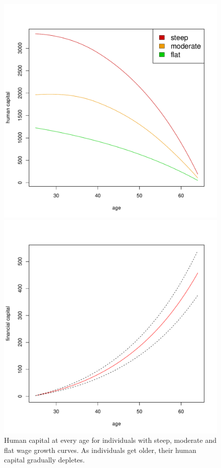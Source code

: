 \documentclass[]{elsarticle}
\begin{document}
\begin{figure}[h!]
	\centering
    \begin{minipage}{0.45\textwidth}
		\centering
		\includegraphics[scale=0.4]{figs/humancapital.pdf}
		\caption{Human capital at every age for individuals with steep, moderate and flat wage growth curves. As individuals get older, their human capital gradually depletes.}
		\label{fig:humcap}
	\end{minipage}
	\hfill
    \begin{minipage}{0.45\textwidth}
		\centering
		\includegraphics[scale=0.4]{figs/fincapital.pdf}

\end{minipage}
\end{figure}
\end{document}
